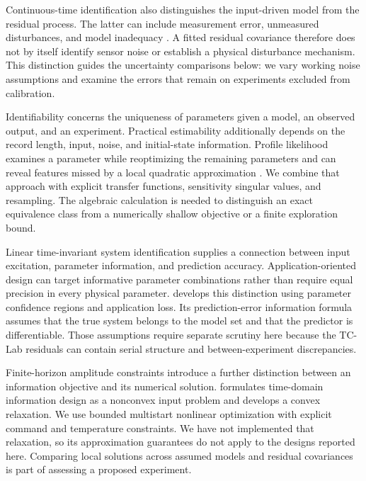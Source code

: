 \documentclass[11pt]{article}
\begin{document}
Continuous-time identification also distinguishes the input-driven model from
the residual process. The latter can include measurement error, unmeasured
disturbances, and model inadequacy \citep{garnier-2008-direct}. A fitted residual
covariance therefore does not by itself identify sensor noise or establish a
physical disturbance mechanism. This distinction guides the uncertainty
comparisons below: we vary working noise assumptions and examine the errors
that remain on experiments excluded from calibration.

Identifiability concerns the uniqueness of parameters given a model, an observed
output, and an experiment. Practical estimability additionally depends on the
record length, input, noise, and initial-state information. Profile likelihood
examines a parameter while reoptimizing the remaining parameters and can reveal
features missed by a local quadratic approximation
\citep{raue-2009-structural}. We combine that approach with explicit transfer
functions, sensitivity singular values, and resampling. The algebraic calculation
is needed to distinguish an exact equivalence class from a numerically shallow
objective or a finite exploration bound.

Linear time-invariant system identification supplies a connection between input
excitation, parameter information, and prediction accuracy. Application-oriented
design can target informative parameter combinations rather than require equal
precision in every physical parameter. \citet{hjalmarsson-2009-system} develops
this distinction using parameter confidence regions and application loss. Its
prediction-error information formula assumes that the true system belongs to
the model set and that the predictor is differentiable. Those assumptions require
separate scrutiny here because the TC-Lab residuals can contain serial structure
and between-experiment discrepancies.

Finite-horizon amplitude constraints introduce a further distinction between an
information objective and its numerical solution. \citet{manchester-2010-input}
formulates time-domain information design as a nonconvex input problem and
develops a convex relaxation. We use bounded multistart nonlinear optimization
with explicit command and temperature constraints. We have not implemented that
relaxation, so its approximation guarantees do not apply to the designs reported
here. Comparing local solutions across assumed models and residual covariances
is part of assessing a proposed experiment.
\end{document}
